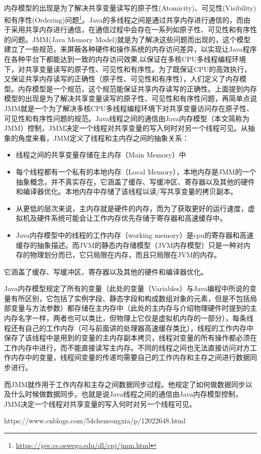 \documentclass[../../../interview-questions.tex]{subfiles}
\begin{document}
\subsection{\color{red}{Java内存模型(Java Memory Model)}}

内存模型的出现是为了解决共享变量读写的原子性(Atomicity)、可见性(Visibility)和有序性(Ordering)问题\footnote{\url{https://gee.cs.oswego.edu/dl/cpj/jmm.html}}。Java的多线程之间是通过共享内存进行通信的，而由于采用共享内存进行通信，在通信过程中会存在一系列如原子性、可见性和有序性的问题。JMM(Java Memory Model)就是为了解决这些问题而出现的，这个模型建立了一些规范，来屏蔽各种硬件和操作系统的内存访问差异，以实现让Java程序在各种平台下都能达到一致的内存访问效果,以保证在多核CPU多线程编程环境下，对共享变量读写的原子性、可见性和有序性。为了既保证CPU的高效执行，又保证共享内存读写的正确性（原子性、可见性和有序性），人们定义了内存模型。内存模型是一个规范，这个规范能保证共享内存读写的正确性。上面提到内存模型的出现是为了解决共享变量读写的原子性、可见性和有序性问题，再简单点说 JMM就是一个为了解决多核CPU多线程编程环境下对共享变量访问存在原子性、可见性和有序性问题的规范。Java线程之间的通信由Java内存模型（本文简称为JMM）控制，JMM决定一个线程对共享变量的写入何时对另一个线程可见。从抽象的角度来看，JMM定义了线程和主内存之间的抽象关系：

\begin{itemize}
    \item {线程之间的共享变量存储在主内存（Main Memory）中}
    \item {每个线程都有一个私有的本地内存（Local Memory），本地内存是JMM的一个抽象概念，并不真实存在，它涵盖了缓存、写缓冲区、寄存器以及其他的硬件和编译器优化。本地内存中存储了该线程以读/写共享变量的拷贝副本。}
    \item {从更低的层次来说，主内存就是硬件的内存，而为了获取更好的运行速度，虚拟机及硬件系统可能会让工作内存优先存储于寄存器和高速缓存中。}
    \item {Java内存模型中的线程的工作内存（working memory）是cpu的寄存器和高速缓存的抽象描述。而JVM的静态内存储模型（JVM内存模型）只是一种对内存的物理划分而已，它只局限在内存，而且只局限在JVM的内存。}
\end{itemize}

它涵盖了缓存、写缓冲区、寄存器以及其他的硬件和编译器优化。

Java内存模型规定了所有的变量（此处的变量（Variables）与Java编程中所说的变量有所区别，它包括了实例字段、静态字段和构成数组对象的元素，但是不包括局部变量与方法参数）都存储在主内存中（此处的主内存与介绍物理硬件时提到的主内存名字一样，两者也可以类比，但物理上它仅是虚拟机内存的一部分），每条线程还有自己的工作内存（可与前面讲的处理器高速缓存类比），线程的工作内存中保存了该线程中是用到的变量的主内存副本拷贝，线程对变量的所有操作都必须在工作内存中进行，而不能直接读写主内存。不同的线程之间也无法直接访问对方工作内存中的变量，线程间变量的传递均需要自己的工作内存和主存之间进行数据同步进行。

而JMM就作用于工作内存和主存之间数据同步过程。他规定了如何做数据同步以及什么时候做数据同步。也就是说Java线程之间的通信由Java内存模型控制， JMM决定一个线程对共享变量的写入何时对另一个线程可见。

https://www.cnblogs.com/54chensongxia/p/12022648.html
\end{document}
